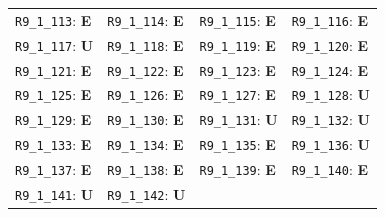 \begin{longtable}{llll}
\texttt{R9\_1\_113}: \textbf{E} & \texttt{R9\_1\_114}: \textbf{E} & \texttt{R9\_1\_115}: \textbf{E} & \texttt{R9\_1\_116}: \textbf{E} \\
\texttt{R9\_1\_117}: \textbf{U} & \texttt{R9\_1\_118}: \textbf{E} & \texttt{R9\_1\_119}: \textbf{E} & \texttt{R9\_1\_120}: \textbf{E} \\
\texttt{R9\_1\_121}: \textbf{E} & \texttt{R9\_1\_122}: \textbf{E} & \texttt{R9\_1\_123}: \textbf{E} & \texttt{R9\_1\_124}: \textbf{E} \\
\texttt{R9\_1\_125}: \textbf{E} & \texttt{R9\_1\_126}: \textbf{E} & \texttt{R9\_1\_127}: \textbf{E} & \texttt{R9\_1\_128}: \textbf{U} \\
\texttt{R9\_1\_129}: \textbf{E} & \texttt{R9\_1\_130}: \textbf{E} & \texttt{R9\_1\_131}: \textbf{U} & \texttt{R9\_1\_132}: \textbf{U} \\
\texttt{R9\_1\_133}: \textbf{E} & \texttt{R9\_1\_134}: \textbf{E} & \texttt{R9\_1\_135}: \textbf{E} & \texttt{R9\_1\_136}: \textbf{U} \\
\texttt{R9\_1\_137}: \textbf{E} & \texttt{R9\_1\_138}: \textbf{E} & \texttt{R9\_1\_139}: \textbf{E} & \texttt{R9\_1\_140}: \textbf{E} \\
\texttt{R9\_1\_141}: \textbf{U} & \texttt{R9\_1\_142}: \textbf{U} &  &  \\
\bottomrule
\end{longtable}
